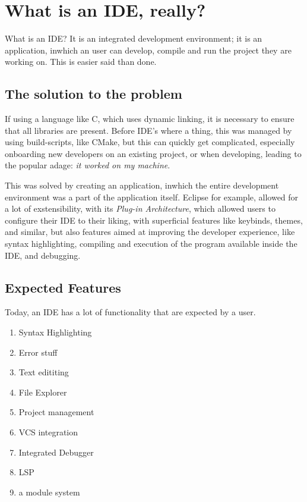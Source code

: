 \documentclass[runningheads]{llncs}
\begin{document}
\section{What is an IDE, really?}
What is an IDE? It is an integrated development environment; it is an
application, inwhich an user can develop, compile and run the project they are
working on. This is easier said than done.

\subsection{The solution to the problem}
If using a language like C, which uses dynamic linking, it is necessary to
ensure that all libraries are present. Before IDE's where a thing, this was
managed by using build-scripts, like CMake, but this can quickly get
complicated, especially onboarding new developers on an existing project, or
when developing, leading to the popular adage: \textit{it worked on my machine}.

This was solved by creating an application, inwhich the entire development
environment was a part of the application itself. Eclipse for example, allowed
for a lot of exstensibility, with its \textit{Plug-in Architecture}, which
allowed users to configure their IDE to their liking, with superficial features
like keybinds, themes, and similar, but also features aimed at improving the
developer experience, like syntax highlighting, compiling and execution of the
program available inside the IDE, and debugging.

\subsection{Expected Features}
Today, an IDE has a lot of functionality that are expected by a user.
\begin{enumerate}
  \item Syntax Highlighting
  \item Error stuff %
  \item Text edititing
  \item File Explorer
  \item Project management
  \item VCS integration
  \item Integrated Debugger
  \item LSP
  \item a module system
\end{enumerate}
\end{document}
